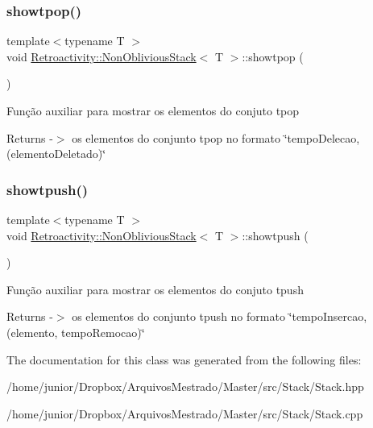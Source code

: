 \subsubsection{\texorpdfstring{showtpop()}{showtpop()}}
{\footnotesize\ttfamily template$<$typename T $>$ \\
void \hyperlink{classRetroactivity_1_1NonObliviousStack}{Retroactivity\+::\+Non\+Oblivious\+Stack}$<$ T $>$\+::showtpop (\begin{DoxyParamCaption}{ }\end{DoxyParamCaption})}

Função auxiliar para mostrar os elementos do conjuto tpop

\begin{DoxyReturn}{Returns}
-\/$>$ os elementos do conjunto tpop no formato \char`\"{}tempo\+Delecao, (elemento\+Deletado)\char`\"{} 
\end{DoxyReturn}
\mbox{\label{classRetroactivity_1_1NonObliviousStack_aabc118d3007e7d56ddf25d71b64f2538}} 
\subsubsection{\texorpdfstring{showtpush()}{showtpush()}}
{\footnotesize\ttfamily template$<$typename T $>$ \\
void \hyperlink{classRetroactivity_1_1NonObliviousStack}{Retroactivity\+::\+Non\+Oblivious\+Stack}$<$ T $>$\+::showtpush (\begin{DoxyParamCaption}{ }\end{DoxyParamCaption})}

Função auxiliar para mostrar os elementos do conjuto tpush

\begin{DoxyReturn}{Returns}
-\/$>$ os elementos do conjunto tpush no formato \char`\"{}tempo\+Insercao, (elemento, tempo\+Remocao)\char`\"{} 
\end{DoxyReturn}


The documentation for this class was generated from the following files\+:\begin{DoxyCompactItemize}
\item 
/home/junior/\+Dropbox/\+Arquivos\+Mestrado/\+Master/src/\+Stack/Stack.\+hpp\item 
/home/junior/\+Dropbox/\+Arquivos\+Mestrado/\+Master/src/\+Stack/Stack.\+cpp\end{DoxyCompactItemize}
